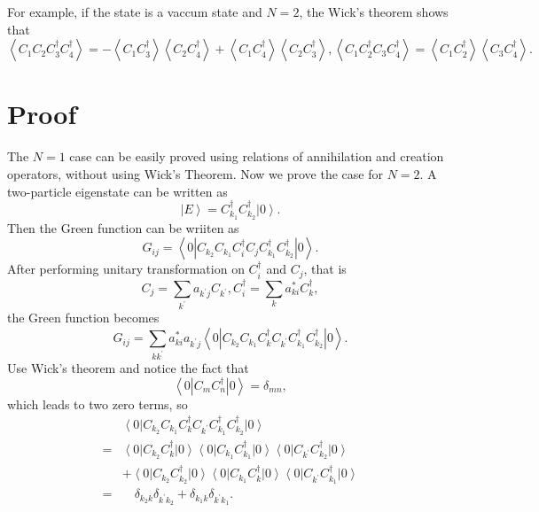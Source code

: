 \documentclass[prb,superscriptaddress,letter,10pt,onecolumn]{revtex4}
\begin{document}
For example, if the state is a vaccum state and $N=2$, the Wick's theorem shows that
\begin{equation}
	\left< C_1 C_2 C_3^\dagger C_4^\dagger \right> =
	-\left< C_1 C_3^\dagger\right>\left< C_2 C_4^\dagger\right>
	+\left< C_1 C_4^\dagger\right>\left< C_2 C_3^\dagger\right>, 
	\left< C_1 C_2^\dagger C_3 C_4^\dagger \right> =
	\left< C_1 C_2^\dagger\right>\left< C_3 C_4^\dagger\right>.
\end{equation}

\section{Proof}

The $N=1$ case can be easily proved using relations of annihilation and creation operators, without using Wick's Theorem.
Now we prove the case for $N=2$.
A two-particle eigenstate can be written as
\begin{equation}
	\left|E\right> = C_{k_1}^\dagger C_{k_2}^\dagger\left|0\right>.
\end{equation}
Then the Green function can be wriiten as
\begin{equation}
	G_{ij} = 
	\left< 0 \left| C_{k_2}C_{k_1}  C_i^\dagger C_j
	C_{k_1}^\dagger C_{k_2}^\dagger\right|0\right>.
\end{equation}
After performing unitary transformation on $C_i^\dagger$ and $C_j$, that is
\begin{equation}
	C_j = \sum_{k^{'}}a_{k^{'}j} C_{k^{'}},
	C_i^\dagger = \sum_{k}a_{ki}^* C_k^\dagger,
\end{equation}
the Green function becomes
\begin{equation}
	G_{ij} = \sum_{kk^{'}} a_{ki}^* a_{k^{'}j}
	\left< 0 \left| C_{k_2}C_{k_1}  C_k^\dagger C_{k^{'}}
	C_{k_1}^\dagger C_{k_2}^\dagger \right|0\right>.
\end{equation}
Use Wick's theorem and notice the fact that
\begin{equation}
	\left< 0 \left| C_m C_n^\dagger \right| 0 \right> = \delta_{mn},
\end{equation}
which leads to two zero terms, so
\begin{equation}
	\begin{aligned}
	&\left< 0 \right| C_{k_2}C_{k_1}  C_k^\dagger C_{k^{'}}
	C_{k_1}^\dagger C_{k_2}^\dagger\left|0\right> \\
	= &\left< 0 \right| C_{k_2} C_k^\dagger \left| 0 \right>
	\left< 0 \right| C_{k_1} C_{k_1}^\dagger \left| 0 \right>
	\left< 0 \right| C_{k^{'}} C_{k_2}^\dagger \left| 0 \right> \\
	&+ \left< 0 \right| C_{k_2} C_{k_2}^\dagger \left| 0 \right> 
	\left< 0 \right| C_{k_1} C_{k}^\dagger \left| 0 \right>
	\left< 0 \right| C_{k^{'}} C_{k_1}^\dagger \left| 0 \right> \\
	= & \quad\delta_{k_2 k} \delta_{k^{'}k_2} + \delta_{k_1 k} \delta_{k^{'}k_1}.
	\end{aligned}		
\end{equation}
\end{document}
